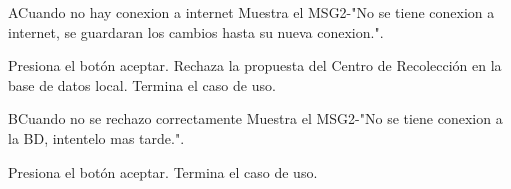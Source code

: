 \begin{UCtrayectoriaA}{A}{Cuando no hay conexion a internet}
	\UCpaso Muestra el MSG2-"No se tiene conexion a internet, se guardaran los cambios hasta su nueva conexion.".
	\item\UCactor Presiona el botón aceptar.
	\UCpaso Rechaza la propuesta del Centro de Recolección en la base de datos local.	
	\UCpaso[] Termina el caso de uso.
\end{UCtrayectoriaA}

\begin{UCtrayectoriaA}{B}{Cuando no se rechazo correctamente}
	\UCpaso Muestra el MSG2-"No se tiene conexion a la BD, intentelo mas tarde.".
	\item\UCactor Presiona el botón aceptar.
	\UCpaso[] Termina el caso de uso.
\end{UCtrayectoriaA}